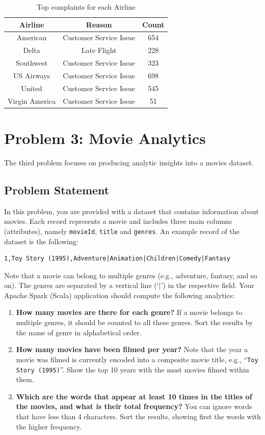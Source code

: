\documentclass[acmlarge]{acmart}
\begin{document}
  \begin{table}[h!]
    \centering
    \begin{tabular}{|c|c|c|}
      \hline
      \textbf{Airline} & \textbf{Reason} & \textbf{Count} \\ \hline
      American & Customer Service Issue & 654  \\ \hline
      Delta & Late Flight & 228 \\ \hline
      Southwest & Customer Service Issue & 323 \\ \hline
      US Airways & Customer Service Issue & 698 \\ \hline
      United & Customer Service Issue & 545 \\ \hline
      Virgin America & Customer Service Issue & 51 \\ \hline
    \end{tabular}
    \caption{Top complaints for each Airline}
  \end{table}


  \section{Problem 3: Movie Analytics}
  \label{sec:problem3}
  The third problem focuses on producing analytic insights into a movies dataset.


  \subsection{Problem Statement}
  In this problem, you are provided with a dataset that contains information about movies. Each record represents a movie and includes three main columns (attributes), namely \texttt{movieId}, \texttt{title} and \texttt{genres}. An example record of the dataset is the following:

  \begin{verbatim}
1,Toy Story (1995),Adventure|Animation|Children|Comedy|Fantasy
  \end{verbatim}

  Note that a movie can belong to multiple genres (e.g., adventure, fantasy, and so on). The genres are separated by a vertical line (`|') in the respective field. Your Apache Spark (Scala) application should compute the following analytics:
  \begin{enumerate}
    \item \textbf{How many movies are there for each genre?} If a movie belongs to multiple genres, it should be counted to all these genres. Sort the results by the name of genre in alphabetical order.
    \item \textbf{How many movies have been filmed per year?} Note that the year a movie was filmed is currently encoded into a composite movie title, e.g., ``\texttt{Toy Story (1995)}''. Show the top 10 years with the most movies filmed within them.
    \item \textbf{Which are the words that appear at least 10 times in the titles of the movies, and what is their total frequency?} You can ignore words that have less than 4 characters. Sort the results, showing first the words with the higher frequency.
  \end{enumerate}
\end{document}
